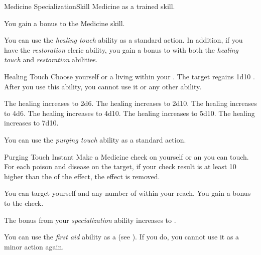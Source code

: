     \begin{feat}{Medicine Specialization}{Skill}
        \featpre Medicine as a trained skill.

         You gain a  bonus to the Medicine skill.

         You can use the \textit{healing touch} ability as a standard action.
        In addition, if you have the \textit{restoration} cleric ability, you gain a  bonus to  with both the \textit{healing touch} and \textit{restoration} abilities.
        \begin{instantability}{Healing Touch}
            \rankline
            Choose yourself or a living  within your .
            The target regains 1d10 \add {} .
            After you use this ability, you  cannot use it or any other  ability.

            \rankline
             The healing increases to 2d6.
             The healing increases to 2d10.
             The healing increases to 4d6.
             The healing increases to 4d10.
             The healing increases to 5d10.
             The healing increases to 7d10.
        \end{instantability}

         You can use the \textit{purging touch} ability as a standard action.
        \begin{instantability}{Purging Touch}
            Instant
            \rankline
            Make a Medicine check on yourself or an  you can touch.
            For each poison and disease on the target, if your check result is at least 10 higher than the  of the effect, the effect is removed.

            \rankline
             You can target yourself and any number of  within your reach.
             You gain a  bonus to the check.
        \end{instantability}

         The bonus from your \textit{specialization} ability increases to .

         You can use the \textit{first aid} ability as a  (see ).
        If you do, you  cannot use it as a minor action again.


\end{feat}
